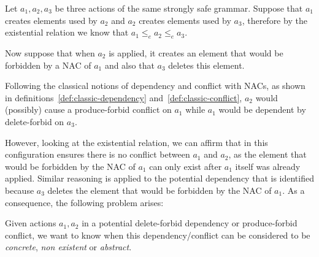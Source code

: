 Let $a_1, a_2, a_3$ be three actions of the same strongly safe grammar. Suppose that $a_1$ creates elements used by $a_2$ and $a_2$ creates elements used by $a_3$, therefore by the existential relation we know that $a_1 \leq_e a_2 \leq_e a_3$.

Now suppose that when $a_2$ is applied, it creates an element that would be forbidden by a NAC of $a_1$ and also that $a_3$ deletes this element. 

Following the classical notions of dependency and conflict with NACs, as shown in definitions~\ref{def:classic-dependency} and~\ref{def:classic-conflict}, $a_2$ would (possibly) cause a produce-forbid conflict on $a_1$ while $a_1$ would be dependent by delete-forbid on $a_3$.

However, looking at the existential relation, we can affirm that in this configuration ensures there is no conflict between $a_1$ and $a_2$, as the element that would be forbidden by the NAC of $a_1$ can only exist after $a_1$ itself was already applied. Similar reasoning is applied to the potential dependency that is identified because $a_3$ deletes the element that would be forbidden by the NAC of $a_1$. As a consequence, the following problem arises:

\begin{intuition}
Given actions $a_1, a_2$ in a potential delete-forbid dependency or produce-forbid conflict, we want to know when this dependency/conflict can be considered to be \emph{concrete}, \emph{non existent} or \emph{abstract}.
\end{intuition}

